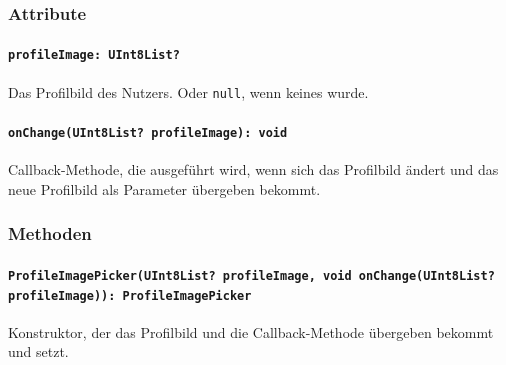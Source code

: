 \documentclass{entwurfsheft}
\begin{document}
\subsubsection*{Attribute}
\paragraph{\texttt{profileImage: UInt8List?}}
Das Profilbild des Nutzers. Oder \texttt{null}, wenn keines wurde.
\paragraph{\texttt{onChange(UInt8List? profileImage): void}}
Callback-Methode, die ausgeführt wird, wenn sich das Profilbild ändert und das neue Profilbild als Parameter übergeben bekommt.
\subsubsection*{Methoden}
\paragraph{\texttt{ProfileImagePicker(UInt8List? profileImage, void onChange(UInt8List? profileImage)): ProfileImagePicker}}
Konstruktor, der das Profilbild und die Callback-Methode übergeben bekommt und setzt.
\newpage
\end{document}
